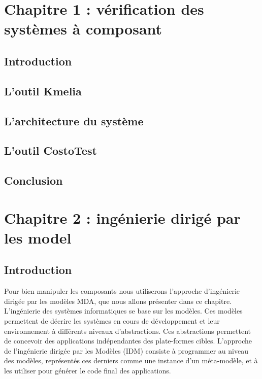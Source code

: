 \documentclass[
10pt, %
a4paper, %
oneside, %
headinclude,footinclude, %
BCOR5mm, %
]{report}
\begin{document}
	\newpage
	\chapter{Chapitre 1 : vérification des systèmes à composant}
	\minitoc
	\section{Introduction}
	\lipsum[5] %
	\section{L'outil Kmelia}
	\lipsum[5] %
	\section{L'architecture du système}
	\lipsum[5] %
	\section{L'outil CostoTest}
	\lipsum[5] %
	\section{Conclusion}
	\lipsum[10]		
								  
														
														
	\newpage 
	\chapter{Chapitre 2 : ingénierie dirigé par les model}
	\minitoc  
	\section{Introduction}
    Pour  bien manipuler les composants nous utiliserons l’approche d'ingénierie dirigée par les modèles MDA, que nous allons présenter dans ce chapitre.
    L’ingénierie  des systèmes informatiques se base sur les modèles. Ces modèles permettent de décrire les systèmes en cours de développement et leur environnement à différents niveaux d’abstractions. Ces abstractions permettent de concevoir des applications indépendantes des plate-formes cibles. 
    L’approche de l’ingénierie dirigée par les Modèles (IDM) consiste à programmer au niveau des modèles, représentés ces derniers comme une instance d’un méta-modèle, et à les utiliser pour générer le code final des applications.\\[1.5cm]
    
\end{document}
